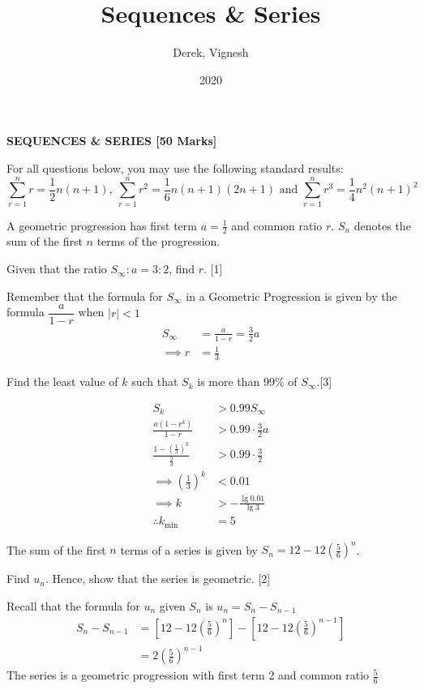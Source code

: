 \documentclass[12pt, a4 paper]{article}
\title{Sequences \& Series}
\author{Derek, Vignesh}
\date{2020}
\begin{document}
\maketitle

\textbf{SEQUENCES \& SERIES [50 Marks]}

For all questions below, you may use the following standard results:
\[
 \sum_{r=1}^{n}r = \frac{1}{2}n(n+1),\: \sum_{r=1}^{n}r^2=\frac{1}{6}n(n+1)(2n+1) \textrm{ and }\sum_{r=1}^{n}r^3=\frac{1}{4}n^2{(n+1)}^2
\]
\begin{outline}[enumerate]
 \1 A geometric progression has first term \(a=\frac{1}{2}\) and common ratio \(r\). \(S_{n}\) denotes the sum of the first \(n\) terms of the progression. %

 \2 Given that the ratio \(S_{\infty}:a=3:2\), find \(r\). \hfill[1]
 \begin{answer}
  Remember that the formula for \( S_\infty \) in a Geometric Progression is given by the formula \( \dfrac{a}{1-r} \) when \( |r|<1 \)
  \begin{align*}
   S_\infty   & = \frac{a}{1-r} = \frac{3}{2}a \\
   \implies r & = \frac{1}{3}
  \end{align*}
 \end{answer}

 \2 Find the least value of \(k\) such that \(S_{k}\) is more than 99\% of \(S_{\infty}\).\hfill[3]
 \begin{answer}
  \begin{align*}
   S_k                                                & > 0.99S_\infty              \\
   \frac{a(1-r^k)}{1-r}                               & > 0.99 \cdot \frac{3}{2}a   \\
   \frac{1-{\left(\frac{1}{3}\right)}^k}{\frac{2}{3}} & > 0.99 \cdot \frac{3}{2}    \\
   \implies {\left(\frac{1}{3}\right)}^k              & < 0.01                      \\
   \implies k                                         & > -\frac{\lg{0.01}}{\lg{3}} \\
   \therefore k_{\min}                                & = 5
  \end{align*}
 \end{answer}

 \1 The sum of the first \(n\) terms of a series is given by \(S_{n}=12-12{\left(\frac{5}{6}\right)}^{n}\). %

 \2 Find \(u_{n}\). Hence, show that the series is geometric. \hfill[2]
 \begin{answer}
  Recall that the formula for \(u_n\) given \(S_n\) is \(u_n = S_n - S_{n-1} \)
  \begin{align*}
   S_n - S_{n-1} & = \left[12-12{\left(\frac{5}{6}\right)}^{n}\right] - \left[12-12{\left(\frac{5}{6}\right)}^{n-1}\right] \\
                 & = 2{\left(\frac{5}{6}\right)}^{n-1}
  \end{align*}
  The series is a geometric progression with first term 2 and common ratio \(\frac{5}{6}\)
 \end{answer}


\end{outline}
\end{document}
